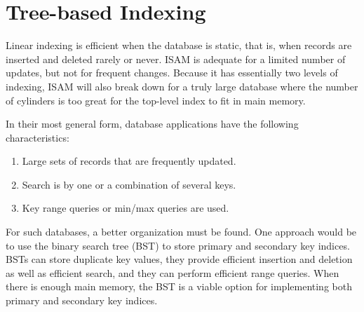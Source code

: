 \section{Tree-based Indexing}
\label{TreeIndex}

Linear indexing is efficient when the database is static,
that is, when records are inserted and deleted rarely or never.
ISAM is adequate for a limited number of updates, but not for frequent
changes.
Because it has essentially two levels of indexing, ISAM will also break
down for a truly large database where the number of cylinders is too
great for the top-level index to fit in main memory.

In their most general form, database applications have the following
characteristics:

\begin{enumerate}

\item
Large sets of records that are frequently updated.

\item
Search is by one or a combination of several keys.

\item
Key range queries or min/max queries are used.

\end{enumerate}

For such databases, a better organization must be found.
One approach would be to use the binary search tree (BST) to store
primary and secondary key indices.
BSTs can store duplicate key values, they provide efficient insertion
and deletion as well as efficient search, and they can perform
efficient range queries.
When there is enough main memory, the BST is a viable
option for implementing both primary and secondary key indices.

